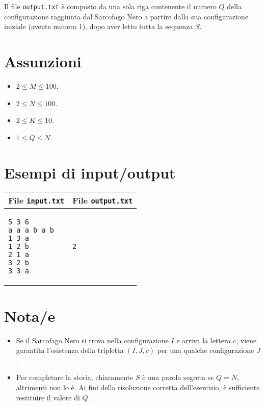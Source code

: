 \documentclass[a4paper,11pt]{article}
\begin{document}
Il file \texttt{output.txt} è composto da una sola riga
contenente il numero $Q$ della configurazione raggiunta dal
Sarcofago Nero a partire dalla sua configurazione iniziale (avente
numero 1), dopo aver letto tutta la sequenza $S$.

\section*{Assunzioni}
\begin{itemize}
  \item $2 ≤ M ≤ 100$.
  \item $2 ≤ N ≤ 100$.
  \item $2 ≤ K ≤ 10$.
  \item $1 ≤ Q ≤ N$.
\end{itemize}

\section*{Esempi di input/output}
    \noindent
    \begin{tabular}{p{11cm}|p{5cm}}
    \toprule
    \textbf{File \texttt{input.txt}}
    & \textbf{File \texttt{output.txt}}
    \\
    \midrule
    \scriptsize
    \begin{verbatim}
5 3 6
a a a b a b
1 3 a 
1 2 b
2 1 a
3 2 b
3 3 a
\end{verbatim}
    &
    \scriptsize
    \begin{verbatim}
2
\end{verbatim}
    \\
    \bottomrule
    \end{tabular}

\section*{Nota/e}
\begin{itemize}
  \item Se il Sarcofago Nero si trova nella configurazione $I$ e
    arriva la lettera $c$, viene garantita l'esistenza della
    tripletta $(I,J,c)$ per una qualche configurazione $J$.
  \item Per completare la storia, chiaramente $S$ è una
    parola segreta se $Q=N$, altrimenti non lo è. Ai fini della
    risoluzione corretta dell'esercizio, è sufficiente restituire il
    valore di $Q$.
\end{itemize}
\end{document}
